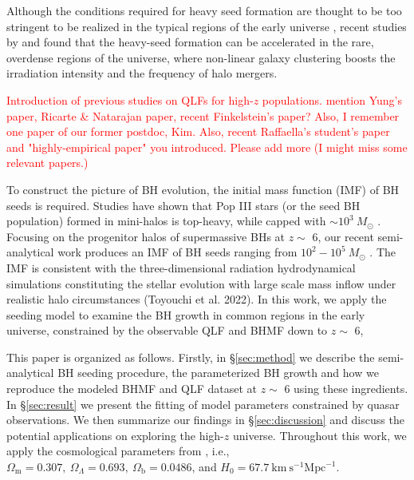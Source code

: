 \documentclass[twocolumn, twocolappendix]{aastex63}
\newcommand{\Msun}{M_\odot}
\newcommand{\red}[1]{\textcolor{red}{ #1}}
\newcommand{\blue}[1]{\textcolor{blue}{ #1}}
\begin{document}
\begin{CJK*}{UTF8}{gbsn}
Although the conditions required for heavy seed formation are thought to be too stringent to be realized in the typical regions of the early universe
\citep{2008MNRAS.391.1961D,2009ApJ...695.1430A,2015MNRAS.450.4350I},
recent studies by \citet{2021MNRAS.503.5046L} and \citet{2021ApJ...917...60L} found that the heavy-seed formation
can be accelerated in the rare, overdense regions of the universe, where non-linear galaxy clustering boosts the irradiation intensity
and the frequency of halo mergers.



\red{Introduction of previous studies on QLFs for high-$z$ populations. mention Yung's paper, Ricarte \& Natarajan paper, recent Finkelstein's paper?
Also, I remember one paper of our former postdoc, Kim.
Also, recent Raffaella's student's paper and "highly-empirical paper" you introduced.
Please add more (I might miss some relevant papers.)}
\blue{
}



To construct the picture of BH evolution, the initial mass function (IMF) of BH seeds is required.
Studies have shown that Pop III stars (or the seed BH population) formed in mini-halos is top-heavy, while capped with $\sim 10^3~\Msun$ 
\citep{2014ApJ...781...60H,2015MNRAS.448..568H}.
Focusing on the progenitor halos of supermassive BHs at $z\sim$ 6, 
our recent semi-analytical work produces an IMF of BH seeds ranging from $10^2-10^5~\Msun$ \citep{2021ApJ...917...60L}. 
The IMF is consistent with the three-dimensional radiation hydrodynamical simulations 
constituting the stellar evolution with large scale mass inflow under realistic halo circumstances (Toyouchi et al. 2022).
In this work, we apply the seeding model to examine the BH growth in common regions in the early universe, 
constrained by the observable QLF and BHMF down to $z\sim$ 6, 

This paper is organized as follows. Firstly, in \S \ref{sec:method} we describe the semi-analytical BH seeding procedure, 
the parameterized BH growth and how we reproduce the modeled BHMF and QLF dataset at $z\sim$ 6 using these ingredients. 
In \S \ref{sec:result} we present the fitting of model parameters constrained by quasar observations. 
We then summarize our findings in \S \ref{sec:discussion} and discuss the potential applications on exploring the high-$z$ universe.
Throughout this work, we apply the cosmological parameters from \cite{2016A&A...594A..13P},
i.e., $\Omega_{\mathrm{m}}=0.307,~\Omega_{\Lambda}=0.693,~
\Omega_{\mathrm{b}}=0.0486$, and $H_0=67.7 \mathrm{~km} \mathrm{~s}^{-1} \mathrm{Mpc}^{-1}$.





\end{CJK*}
\end{document}
